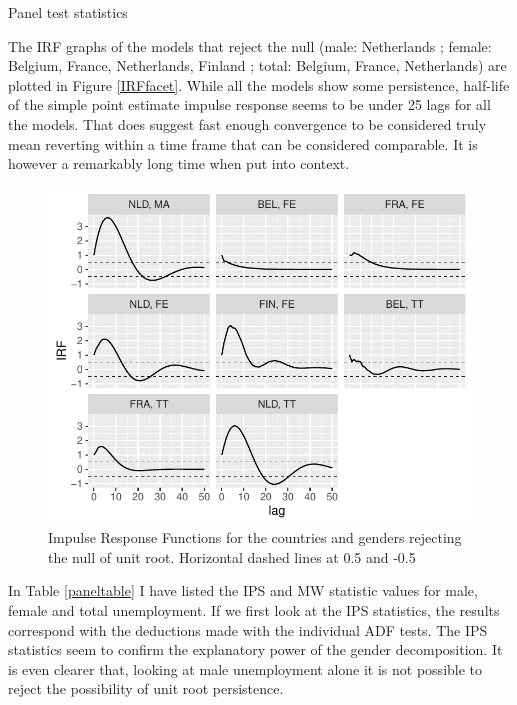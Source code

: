 \documentclass[12pt,a4paper,english]{article}
\begin{document}
\begin{table}\label{paneltable}
\vspace{1.5cm}
\centering

\caption{Panel test statistics}
\vspace{1.5cm}
\end{table}

The IRF graphs of the models that reject the null (male: Netherlands ; female: Belgium, France, Netherlands, Finland ; total: Belgium, France, Netherlands) are plotted in Figure \ref{IRFfacet}. While all the models show some persistence, half-life of the simple point estimate impulse response seems to be under 25 lags for all the models. That does suggest fast enough convergence to be considered truly mean reverting within a time frame that can be considered comparable. It is however a remarkably long time when put into context.

\begin{figure} \label{IRFfacet}
\centering
\includegraphics[width=0.9\linewidth]{Graphs/STSA_IRF_facet}
\caption{Impulse Response Functions for the countries and genders rejecting the null of unit root. Horizontal dashed lines at 0.5 and -0.5}
\label{fig:stsairffacet}
\end{figure}
%

In Table \ref{paneltable} I have listed the IPS and MW statistic values for male, female and total unemployment. If we first look at the IPS statistics, the results correspond with the deductions made with the individual ADF tests. The IPS statistics seem to confirm the explanatory power of the gender decomposition. It is even clearer that, looking at male unemployment alone it is not possible to reject the possibility of unit root persistence.
\end{document}
